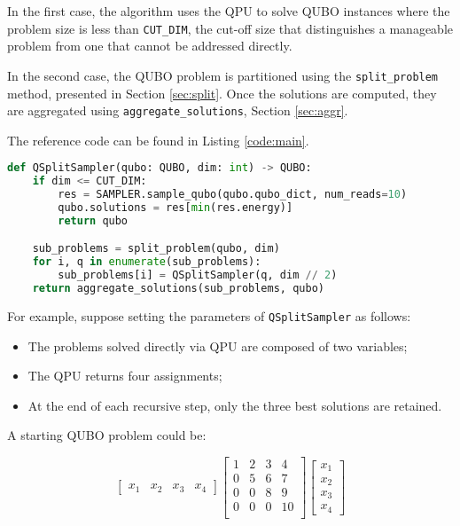 In the first case, the algorithm uses the QPU to solve QUBO instances where the problem size is less than \texttt{CUT\_DIM}, the cut-off size that distinguishes a manageable problem from one that cannot be addressed directly.

In the second case, the QUBO problem is partitioned using the \texttt{split\_problem} method, presented in Section \ref{sec:split}. 
Once the solutions are computed, they are aggregated using \texttt{aggregate\_solutions}, Section \ref{sec:aggr}.

The reference code can be found in Listing \ref{code:main}.

\begin{lstlisting}[language=Python, caption=QSplitSampler main function, label=code:main]
def QSplitSampler(qubo: QUBO, dim: int) -> QUBO:
    if dim <= CUT_DIM:
        res = SAMPLER.sample_qubo(qubo.qubo_dict, num_reads=10)
        qubo.solutions = res[min(res.energy)]
        return qubo

    sub_problems = split_problem(qubo, dim)
    for i, q in enumerate(sub_problems):
        sub_problems[i] = QSplitSampler(q, dim // 2)
    return aggregate_solutions(sub_problems, qubo)
\end{lstlisting}

For example, suppose setting the parameters of \texttt{QSplitSampler} as follows:
\begin{itemize}
    \item The problems solved directly via QPU are composed of two variables;
    \item The QPU returns four assignments;
    \item At the end of each recursive step, only the three best solutions are retained.
\end{itemize}

A starting QUBO problem could be:

\begin{equation}
    \begin{bmatrix}
        x_1 & x_2 & x_3 & x_4
    \end{bmatrix}
    \begin{bmatrix}
        1 & 2 & 3 & 4 \\
        0 & 5 & 6 & 7 \\
        0 & 0 & 8 & 9 \\
        0 & 0 & 0 & 10 \\
    \end{bmatrix}
    \begin{bmatrix}
        x_1 \\
        x_2 \\
        x_3 \\
        x_4
    \end{bmatrix}
    \label{eq:example_full}
\end{equation}

